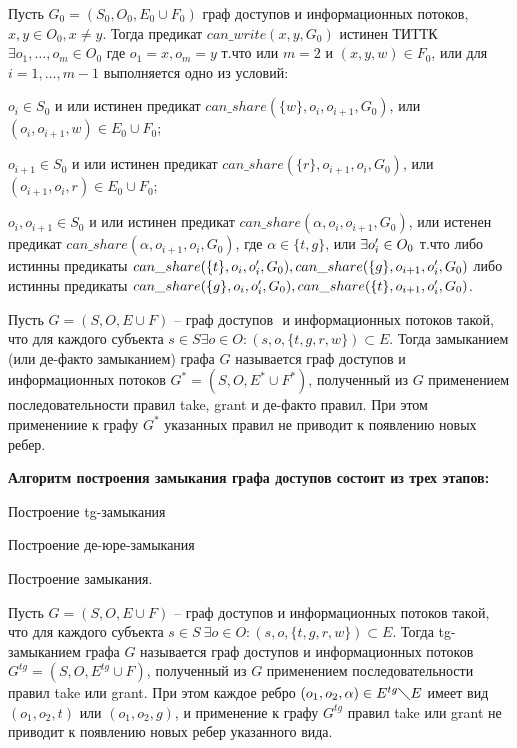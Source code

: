 \begin{proofs}
	Пусть $G_0 = (S_0, O_0, E_0 \cup F_0)$ граф доступов и информационных потоков, $x,y \in O_0, x \neq y.$
	Тогда предикат $can\_write(x,y,G_0)$ истинен ТИТТК $\exists o_1, \ldots, o_m \in O_0$ где
	$o_1 = x, o_m = y$ т.что или $m = 2$ и $(x,y,w) \in F_0$, или для $i = 1, \ldots, m-1$ выполняется одно из условий:
	\begin{itemize*}
		\item $o_i \in S_0$ и или истинен предикат $can\_share(\{w\}, o_i, o_{i+1}, G_0)$, или $(o_i, o_{i+1}, w) \in E_0 \cup F_0$;
		\item $o_{i+1} \in S_0$ и или истинен предикат $can\_share(\{r\}, o_{i+1}, o_i, G_0)$, или $(o_{i+1}, o_i, r) \in E_0 \cup F_0$;
		\item $o_i,o_{i+1} \in S_0$ и или истинен предикат $can\_share(\alpha, o_i, o_{i+1}, G_0)$, или истенен предикат $can\_share(\alpha, o_{i+1}, o_i, G_0)$, где
		$\alpha \in \{t,g\}$, или $\exists o_i^{\prime} \in O_0$ т.что либо истинны предикаты $can\_share(\{t\}, o_i, o_i^{\prime}, G_0), can\_share(\{g\}, o_{i+1}, o_i^{\prime}, G_0)$
		либо истинны предикаты $can\_share(\{g\}, o_i, o_i^{\prime}, G_0), can\_share(\{t\}, o_{i+1}, o_i^{\prime}, G_0)$.
	\end{itemize*}
\end{proofs}

\begin{defs}
	Пусть $G = (S, O, E \cup F)$ -- граф доступов $ $ и информационных потоков такой, что для каждого субъекта
	$s \in S \exists o \in O : (s,o,\{t,g,r,w\}) \subset E$. Тогда замыканием (или де-факто замыканием)
	графа $G$ называется граф доступов и информационных потоков $G^* = (S, O, E^* \cup F^*)$, полученный
	из $G$ применением последовательности правил take, grant и де-факто правил. При этом применениие к
	графу $G^*$ указанных правил не приводит к появлению новых ребер.
\end{defs}

\textbf{Алгоритм построения замыкания графа доступов состоит из трех этапов:}
\begin{enumerate*}
	\item Построение tg-замыкания
	\item Построение де-юре-замыкания
	\item Построение замыкания.
\end{enumerate*}

\begin{defs}
	Пусть $G = (S, O, E \cup F)$ -- граф доступов и информационных потоков такой, что для каждого субъекта
	$s \in S \ \exists o \in O : (s,o,\{t,g,r,w\}) \subset E$. Тогда tg-замыканием
	графа $G$ называется граф доступов и информационных потоков $G^{tg} = (S, O, E^{tg} \cup F)$, полученный
	из $G$ применением последовательности правил take или grant. При этом каждое ребро $(o_1, o_2, \alpha)
	\in E^{tg} \diagdown E$ имеет вид $(o_1, o_2, t)$ или $(o_1, o_2, g)$, и применение к графу $G^{tg}$ правил
	take или grant не приводит к появлению новых ребер указанного вида.
\end{defs}

